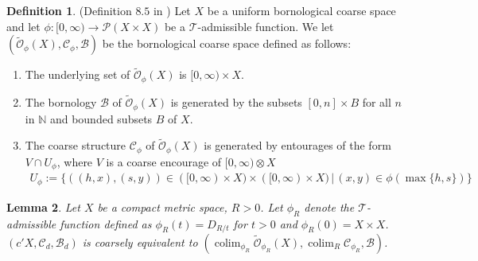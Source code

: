 \documentclass[a4paper,11pt]{article}
\theoremstyle{definition}
\newtheorem{definition}{Definition}[section]
\theoremstyle{plain}
\newtheorem{lemma}[definition]{Lemma}
\theoremstyle{remark}
\DeclareMathOperator{\colim}{colim}
\begin{document}
\begin{definition} (Definition $8.5$ in \cite{bunke2020coarse}) Let $X$ be a uniform bornological coarse space and let $\phi:[0,\infty)\rightarrow \mathcal{P}(X\times X)$ be a $\mathcal{T}$-admissible function. We let $(\tilde{\mathcal{O}}_{\phi}(X), \mathcal{C}_{\phi},\mathcal{B})$ be the bornological coarse space defined as follows:
\begin{enumerate}
\item The underlying set of $\tilde{\mathcal{O}}_{\phi}(X)$ is $[0,\infty) \times X$.
\item The bornology $\mathcal{B}$ of $\tilde{\mathcal{O}}_{\phi}(X)$ is generated by the subsets $[0,n] \times B$ for all $n$ in  $\mathbb{N}$ and bounded subsets $B$ of $X$.
\item The coarse structure  $\mathcal{C}_{\phi}$ of $\tilde{\mathcal{O}}_{\phi}(X)$ is generated by entourages of the form $V\cap U_{\phi}$, where $V$ is a coarse encourage of $[0,\infty)\otimes X$ 
\begin{align*}
U_{\phi}:= \{((h,x),(s,y))\in ([0,\infty) \times X) \times ([0,\infty) \times X) \,|\,(x,y)\in \phi(\max\{h,s\})\}
\end{align*}
 \end{enumerate}
 \end{definition}



 
\begin{lemma} Let $X$ be a compact metric space, $R>0$. Let $\phi_{R}$ denote the $\mathcal{T}$-admissible function defined as $\phi_{R}(t) = D_{R/t}$ for $t>0$ and $\phi_{R}(0)=X\times X$. $(c'X, \mathcal{C}_{d}, \mathcal{B}_{d})$ is coarsely equivalent to $(\colim_{\phi_{R}}\tilde{\mathcal{O}}_{\phi_{R}}(X), \colim_{R} \mathcal{C}_{\phi_{R}},\mathcal{B})$.
\end{lemma}
\end{document}
